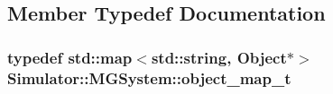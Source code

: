 \subsection{Member Typedef Documentation}
\hypertarget{class_simulator_1_1_m_g_system_ae7bb90912b7e1348ab3ddefa4e8bc431}{
\subsubsection[{object\+\_\+map\+\_\+t}]{\setlength{\rightskip}{0pt plus 5cm}typedef std\+::map$<$std\+::string, {\bf Object}$\ast$$>$ {\bf Simulator\+::\+M\+G\+System\+::object\+\_\+map\+\_\+t}}}\label{class_simulator_1_1_m_g_system_ae7bb90912b7e1348ab3ddefa4e8bc431}


